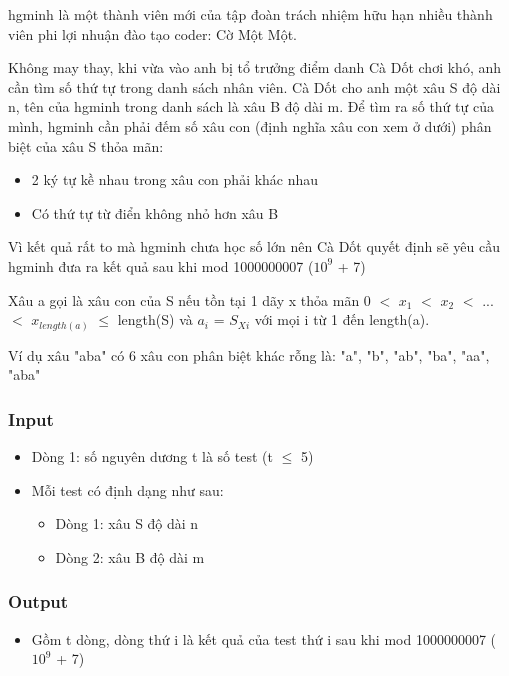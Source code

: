 



   hgminh là một thành viên mới của tập đoàn trách nhiệm hữu hạn nhiều thành viên phi lợi nhuận đào tạo coder: Cờ Một Một.  

   Không may thay, khi vừa vào anh bị tổ trưởng điểm danh Cà Dốt chơi khó, anh cần tìm số thứ tự trong danh sách nhân viên. Cà Dốt cho anh một xâu S độ dài n, tên của hgminh trong danh sách là xâu B độ dài m. Để tìm ra số thứ tự của mình, hgminh cần phải đếm số xâu con (định nghĩa xâu con xem ở dưới) phân biệt của xâu S thỏa mãn:  
\begin{itemize}
	\item     2 ký tự kề nhau trong xâu con phải khác nhau   
	\item     Có thứ tự từ điển không nhỏ hơn xâu B   
\end{itemize}

   Vì kết quả rất to mà hgminh chưa học số lớn nên Cà Dốt quyết định sẽ yêu cầu hgminh đưa ra kết quả sau khi mod 1000000007 ($10^{9}$   + 7)  



   Xâu a gọi là xâu con của S nếu tồn tại 1 dãy x thỏa mãn 0 $<$ $x_{1}$   $<$ $x_{2}$   $<$ ...$<$ $x_{length(a)}$    $\le$  length(S) và $a_{i}$   = $S_{Xi}$   với mọi i từ 1 đến length(a).  

   Ví dụ xâu "aba" có 6 xâu con phân biệt khác rỗng là: "a", "b", "ab", "ba", "aa", "aba"  



\subsubsection{   Input  }
\begin{itemize}
	\item     Dòng 1: số nguyên dương t là số test (t  $\le$  5)   
	\item     Mỗi test có định dạng như sau:    
\begin{itemize}
	\item       Dòng 1: xâu S độ dài n     
	\item       Dòng 2: xâu B độ dài m     
\end{itemize}
\end{itemize}

\subsubsection{   Output  }
\begin{itemize}
	\item     Gồm t dòng, dòng thứ i là kết quả của test thứ i sau khi mod 1000000007 ($10^{9}$    + 7)   
\end{itemize}



